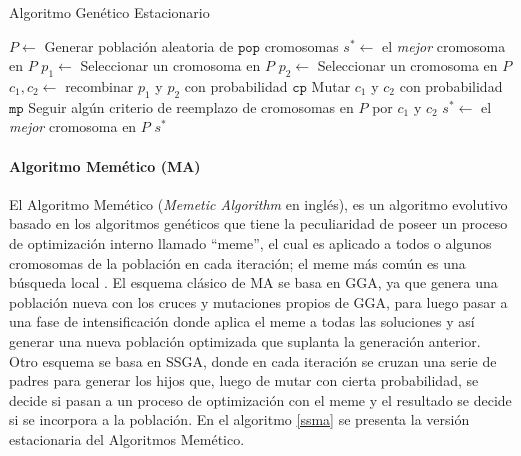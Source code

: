 \begin{algorithm}
\caption{Algoritmo Genético Estacionario}
\label{sga}
\begin{algorithmic}[1]


\State $P \gets$ Generar población aleatoria de $\texttt{pop}$ cromosomas
\State $s^* \gets $ el \emph{mejor} cromosoma en $P$
	\State $p_1 \gets$ Seleccionar un cromosoma en $P$
	\State $p_2 \gets$ Seleccionar un cromosoma en $P$
	\State $c_1, c_2 \gets $ recombinar $p_1$ y $p_2$ con probabilidad $\texttt{cp}$
	\State Mutar $c_1$ y $c_2$ con probabilidad $\texttt{mp}$
	\State Seguir algún criterio de reemplazo de cromosomas en $P$ por $c_1$ y $c_2$
		\State $s^* \gets$ el \emph{mejor} cromosoma en $P$
	\EndIf
\EndWhile
\State \Return $s^*$

\end{algorithmic}
\end{algorithm}

\paragraph{Algoritmo Memético (MA)}

El Algoritmo Memético (\emph{Memetic Algorithm} en inglés), es un algoritmo evolutivo basado en los algoritmos genéticos que tiene la peculiaridad de poseer un proceso de optimización interno llamado ``meme'', el cual es aplicado a todos o algunos cromosomas de la población en cada iteración; el meme más común es una búsqueda local \cite{neri2012memetic}. El esquema clásico de MA se basa en  GGA, ya que genera una población nueva con los cruces y mutaciones propios de GGA, para luego pasar a una fase de intensificación donde aplica el meme a todas las soluciones y así generar una nueva población optimizada que suplanta la generación anterior. Otro esquema se basa en SSGA, donde en cada iteración se cruzan una serie de padres para generar los hijos que, luego de mutar con cierta probabilidad, se decide si pasan a un proceso de optimización con el meme y el resultado se decide si se incorpora a la población.  En el algoritmo \ref{ssma} se presenta la versión estacionaria del Algoritmos Memético.

